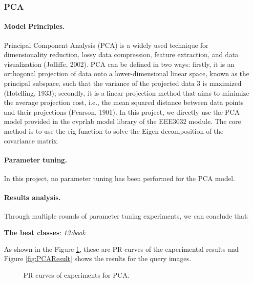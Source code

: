 \documentclass{article}
\begin{document}
\subsubsection{PCA}

\paragraph{Model Principles.}
Principal Component Analysis (PCA) is a widely used technique for dimensionality reduction, lossy data compression, feature extraction, and data visualization (Jolliffe, 2002).  PCA can be defined in two ways: firstly, it is an orthogonal projection of data onto a lower-dimensional linear space, known as the principal subspace, such that the variance of the projected data 3  is maximized (Hotelling, 1933); secondly, it is a linear projection method that aims to minimize the average projection cost, i.e., the mean squared distance between data points and their projections (Pearson, 1901). In this project, we directly use the PCA model provided in the cvprlab model library of the EEE3032 module. The core method is to use the eig function to solve the Eigen decomposition of the covariance matrix.


\paragraph{Parameter tuning.}
In this project, no parameter tuning has been performed for the PCA model.

\paragraph{Results analysis.}
Through multiple rounds of parameter tuning experiments, we can conclude that:

\noindent \textbf{The best classes}: \textit{13:book}

As shown in the Figure \ref{fig:PCAPR}, these are PR curves of the experimental results and Figure \ref{fig:PCAResult} shows the results for the query images.

\begin{figure}[!tbp]
  \centering
  \hfill
  \hfill
  \caption{\label{fig:PCAPR} PR curves of experiments for PCA.}
\end{figure}
\end{document}
